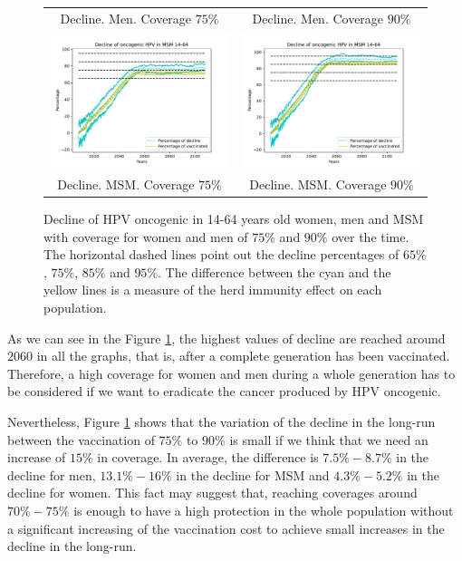 \begin{figure}[!]
\begin{tabular}{cc}
		Decline. Men. Coverage $75\%$	& Decline. Men. Coverage $90\%$ \\ 		
		\includegraphics[width=0.5\linewidth]{IMGs/9.-Erradicacion_ONCO/onco_MSM_75.pdf}	& 
		\includegraphics[width=0.5\linewidth]{IMGs/9.-Erradicacion_ONCO/onco_MSM_90.pdf}  \\ 
		Decline. MSM. Coverage $75\%$	& Decline. MSM. Coverage $90\%$
	\end{tabular} 
	\caption{Decline of HPV oncogenic in 14-64 years old women, men and MSM with coverage for women and men of $75\%$ and $90\%$ over the time. The horizontal dashed lines point out the decline percentages of $65\%$, $75\%$, $85\%$ and $95\%$. The difference between the cyan and the yellow lines is a measure of the herd immunity effect on each population.}
	\label{fig:erradicacion}
\end{figure}

As we can see in the Figure \ref{fig:erradicacion}, the highest values of decline are reached around $2060$ in all the graphs, that is, after a complete generation has been vaccinated. Therefore, a high coverage for women and men during a whole generation has to be considered if we want to eradicate the cancer produced by HPV oncogenic. 

Nevertheless, Figure \ref{fig:erradicacion} shows that the variation of the decline in the long-run between the vaccination of $75\%$ to $90\%$ is small if we think that we need an increase of $15\%$ in coverage. In average, the difference is $7.5\% - 8.7\%$ in the decline for men, $13.1\%-16\%$ in the decline for MSM and $4.3\%-5.2\%$ in the decline for women. This fact may suggest that, reaching coverages around $70\% - 75\%$ is enough to have a high protection in the whole population without a significant increasing of the vaccination cost to achieve small increases in the decline in the long-run.

